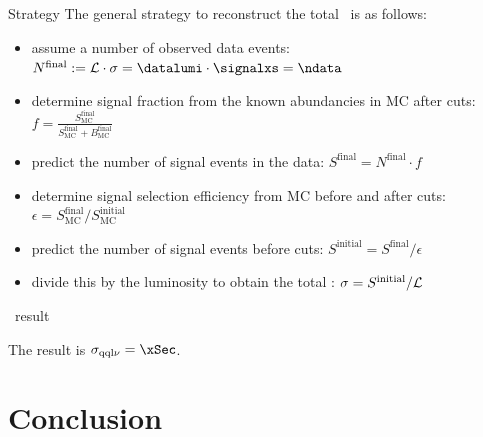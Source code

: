 \documentclass{beamer}
\newcommand{\texpath}{../analysis/tex/tex_ex}
\begin{document}
\begin{frame}{Strategy}
The general strategy to reconstruct the total \xsec\ is as follows:
\begin{itemize}
\item assume a number of observed data events: \newline
  $N^\mathrm{final} := \lumi \cdot \sigma = \datalumi \cdot \signalxs = \ndata$
\item determine signal fraction from the known abundancies in MC after cuts: \newline
  $f = \frac{S^\mathrm{final}_\mathrm{MC}}{S^\mathrm{final}_\mathrm{MC} + B^\mathrm{final}_\mathrm{MC}}$
\item predict the number of signal events in the data: \newline
  $S^\mathrm{final} = N^\mathrm{final} \cdot f$
\item determine signal selection efficiency from MC before and after cuts: \newline
  $\epsilon = S^\mathrm{final}_\mathrm{MC} / S^\mathrm{initial}_\mathrm{MC}$
\item predict the number of signal events before cuts: \newline
  $S^\mathrm{initial} = S^\mathrm{final} / \epsilon$
\item divide this by the luminosity to obtain the total \xsec: \newline
  $\sigma = S^\mathrm{initial} / \mathcal L$
\end{itemize}

\end{frame}

\begin{frame}{\Xsec\ result}

\vspace{-2em}

\vspace{-1em}
The result is $\sigma_\mathrm{\qqln} = \xSec$.
\end{frame}






\section{Conclusion}
\end{document}
